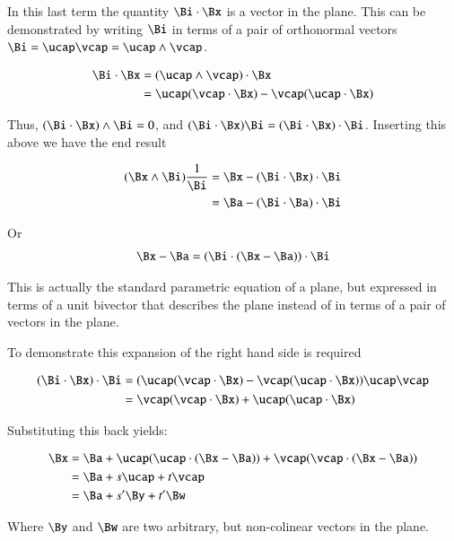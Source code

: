 In this last term the quantity $\Bi \cdot \Bx$ is a vector in the plane.
This can be demonstrated by writing $\Bi$ in terms of a pair of orthonormal
vectors $\Bi = \ucap\vcap = \ucap \wedge \vcap$.

\begin{align*}
\Bi \cdot \Bx &= (\ucap \wedge \vcap) \cdot \Bx \\
              &= \ucap (\vcap \cdot \Bx) - \vcap (\ucap \cdot \Bx) \\
\end{align*}

Thus, $(\Bi \cdot \Bx) \wedge \Bi = 0$, 
and $(\Bi \cdot \Bx) \Bi = (\Bi \cdot \Bx) \cdot \Bi$.  Inserting this above
we have the end result

\begin{align*}
(\Bx \wedge \Bi)\frac{1}{\Bi} 
&= \Bx - (\Bi \cdot \Bx) \cdot \Bi \\ 
&= \Ba - (\Bi \cdot \Ba) \cdot \Bi \\ 
\end{align*}

Or
\begin{align*}
\Bx  - \Ba 
&= (\Bi \cdot (\Bx - \Ba)) \cdot \Bi \\ 
\end{align*}

This is actually the standard parametric equation of a plane, but expressed
in terms of a unit bivector that describes the plane instead of in terms
of a pair of vectors in the plane.

To demonstrate this expansion of the right hand side is required

\begin{align*}
(\Bi \cdot \Bx) \cdot \Bi
&= (\ucap (\vcap \cdot \Bx) - \vcap (\ucap \cdot \Bx)) \ucap \vcap \\
&= \vcap (\vcap \cdot \Bx) + \ucap (\ucap \cdot \Bx) \\
\end{align*}

Substituting this back yields:

\begin{align*}
\Bx 
&= \Ba + \ucap (\ucap \cdot (\Bx - \Ba)) + \vcap (\vcap \cdot (\Bx - \Ba)) \\
&= \Ba + s \ucap + t \vcap \\
&= \Ba + s' \By + t' \Bw \\
\end{align*}

Where $\By$ and $\Bw$ are two arbitrary, but non-colinear vectors 
in the plane.

